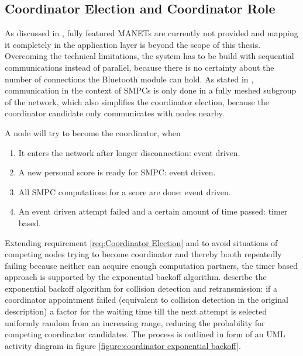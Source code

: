 \subsection{Coordinator Election and Coordinator Role} \label{Coordinator Election}

As discussed in , fully featured \glspl{MANET} are currently not provided and mapping it completely in the application layer is beyond the scope of this thesis. Overcoming the technical limitations, the system has to be build with sequential communications instead of parallel, because there is no certainty about the number of connections the Bluetooth module can hold. As stated in , communication in the context of \glspl{SMPC} is only done in a fully meshed subgroup of the network, which also simplifies the coordinator election, because the coordinator candidate only communicates with nodes nearby.

\noindent A node will try to become the coordinator, when \nolinebreak
\begin{enumerate}
	\item It enters the network after longer disconnection: event driven.
	\item A new personal score is ready for \gls{SMPC}: event driven.
	\item All \gls{SMPC} computations for a score are done: event driven.
	\item An event driven attempt failed and a certain amount of time passed: timer based.
\end{enumerate}

Extending requirement \ref{req:Coordinator Election} and to avoid situations of competing nodes trying to become coordinator and thereby booth repeatedly failing because neither can acquire enough computation partners, the timer based approach is supported by the exponential backoff algorithm. \textcite[p.67]{IEEE2010} describe the exponential backoff algorithm for collision detection and retransmission: if a coordinator appointment failed (equivalent to collision detection in the original description) a factor for the waiting time till the next attempt is selected uniformly random from an increasing range, reducing the probability for competing coordinator candidates. The process is outlined in form of an \gls{UML} activity diagram in figure \ref{figure:coordinator exponential backoff}.

